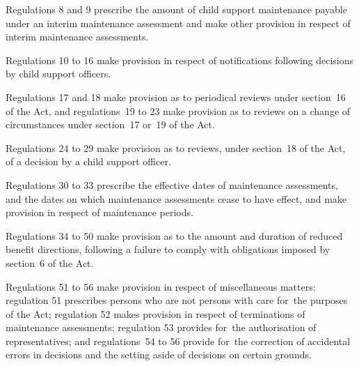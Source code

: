 \documentclass[a4paper,12pt]{article}
\begin{document}
  Regulations 8 and 9 prescribe the amount of child support maintenance payable under an interim maintenance assessment and make other provision in respect of interim maintenance assessments.

  Regulations 10 to 16 make provision in respect of notifications following decisions by child support officers.

  Regulations 17 and 18 make provision as to periodical reviews under section~16 of the Act, and regulations~19 to 23 make provision as to reviews on a change of circumstances under section~17 or~19 of the Act.

  Regulations 24 to 29 make provision as to reviews, under section~18 of the Act, of a decision by a child support officer.

  Regulations 30 to 33 prescribe the effective dates of maintenance assessments, and the dates on which maintenance assessments cease to have effect, and make provision in respect of maintenance periods.

  Regulations 34 to 50 make provision as to the amount and duration of reduced benefit directions, following a failure to comply with obligations imposed by section~6 of the Act.

  Regulations 51 to 56 make provision in respect of miscellaneous matters: regulation 51 prescribes persons who are not persons with care for~the purposes of the Act; regulation 52 makes provision in respect of terminations of maintenance assessments; regulation 53 provides for~the authorisation of representatives; and regulations~54 to 56 provide for~the correction of accidental errors in decisions and the setting aside of decisions on certain grounds.
\end{document}
